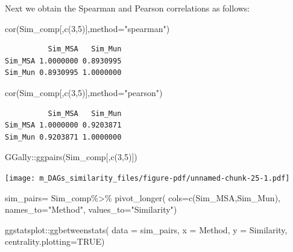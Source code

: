 \documentclass[
  letterpaper,
  DIV=11,
  numbers=noendperiod]{scrreprt}
\newenvironment{Shaded}{}{}
\newcommand{\AttributeTok}[1]{\textcolor[rgb]{0.78,0.47,0.87}{#1}}
\newcommand{\ConstantTok}[1]{\textcolor[rgb]{0.82,0.60,0.40}{#1}}
\newcommand{\DecValTok}[1]{\textcolor[rgb]{0.82,0.60,0.40}{#1}}
\newcommand{\FunctionTok}[1]{\textcolor[rgb]{0.38,0.69,0.94}{#1}}
\newcommand{\NormalTok}[1]{\textcolor[rgb]{0.67,0.70,0.75}{#1}}
\newcommand{\OtherTok}[1]{\textcolor[rgb]{0.15,0.68,0.38}{#1}}
\newcommand{\SpecialCharTok}[1]{\textcolor[rgb]{0.34,0.71,0.76}{#1}}
\newcommand{\StringTok}[1]{\textcolor[rgb]{0.60,0.76,0.47}{#1}}
\begin{document}
Next we obtain the Spearman and Pearson correlations as follows:

\begin{Shaded}
\begin{Highlighting}[]
\FunctionTok{cor}\NormalTok{(Sim\_comp[,}\FunctionTok{c}\NormalTok{(}\DecValTok{3}\NormalTok{,}\DecValTok{5}\NormalTok{)],}\AttributeTok{method=}\StringTok{"spearman"}\NormalTok{)}
\end{Highlighting}
\end{Shaded}

\begin{verbatim}
          Sim_MSA   Sim_Mun
Sim_MSA 1.0000000 0.8930995
Sim_Mun 0.8930995 1.0000000
\end{verbatim}

\begin{Shaded}
\begin{Highlighting}[]
\FunctionTok{cor}\NormalTok{(Sim\_comp[,}\FunctionTok{c}\NormalTok{(}\DecValTok{3}\NormalTok{,}\DecValTok{5}\NormalTok{)],}\AttributeTok{method=}\StringTok{"pearson"}\NormalTok{)}
\end{Highlighting}
\end{Shaded}

\begin{verbatim}
          Sim_MSA   Sim_Mun
Sim_MSA 1.0000000 0.9203871
Sim_Mun 0.9203871 1.0000000
\end{verbatim}

\begin{Shaded}
\begin{Highlighting}[]
\NormalTok{GGally}\SpecialCharTok{::}\FunctionTok{ggpairs}\NormalTok{(Sim\_comp[,}\FunctionTok{c}\NormalTok{(}\DecValTok{3}\NormalTok{,}\DecValTok{5}\NormalTok{)])}
\end{Highlighting}
\end{Shaded}

\texttt{[image: m\_DAGs\_similarity\_files/figure-pdf/unnamed-chunk-25-1.pdf]}

\begin{Shaded}
\begin{Highlighting}[]
\NormalTok{sim\_pairs}\OtherTok{=}\NormalTok{ Sim\_comp}\SpecialCharTok{\%\textgreater{}\%} \FunctionTok{pivot\_longer}\NormalTok{(}
  \AttributeTok{cols=}\FunctionTok{c}\NormalTok{(Sim\_MSA,Sim\_Mun),}
  \AttributeTok{names\_to=}\StringTok{"Method"}\NormalTok{,}
  \AttributeTok{values\_to=}\StringTok{"Similarity"}\NormalTok{)}

\NormalTok{ggstatsplot}\SpecialCharTok{::}\FunctionTok{ggbetweenstats}\NormalTok{(}
  \AttributeTok{data =}\NormalTok{ sim\_pairs,}
  \AttributeTok{x =}\NormalTok{ Method,}
  \AttributeTok{y =}\NormalTok{ Similarity,}
  \AttributeTok{centrality.plotting=}\ConstantTok{TRUE}\NormalTok{)}
\end{Highlighting}
\end{Shaded}
\end{document}
